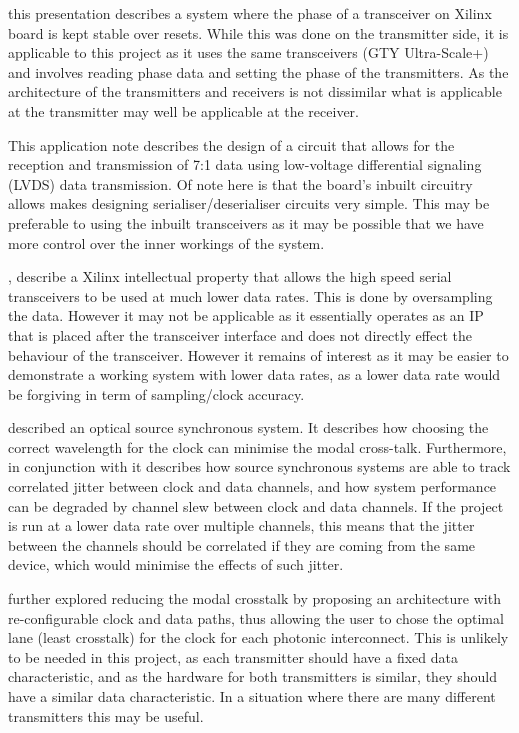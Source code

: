 \noindent \cite{mendes_transceiver} this presentation describes a system where
the phase of a transceiver on Xilinx board is kept stable over resets. While
this was done on the transmitter side, it is applicable to this project as it
uses the same transceivers (GTY Ultra-Scale+) and involves reading phase data
and setting the phase of the transmitters. As the architecture of the
transmitters and receivers is not dissimilar what is applicable at the
transmitter may well be applicable at the receiver.

\noindent \cite{serdes}  This application note describes the design of 
a circuit that allows for the reception and transmission of 7:1 data using
low-voltage differential signaling (LVDS) data transmission. Of note here is
that the board's inbuilt circuitry allows makes designing serialiser/deserialiser
circuits very simple. This may be preferable to using the inbuilt transceivers
as it may be possible that we have more control over the inner workings of the
system.

\noindent \cite{dru_guide}, \cite{nidru} describe a Xilinx intellectual
property that allows the high speed serial transceivers to be used at much
lower data rates. This is done by oversampling the data. However it may not be
applicable as it essentially operates as an IP that is placed after the
transceiver interface and does not directly effect the behaviour of the
transceiver. However it remains of interest as it may be easier to demonstrate a
working system with lower data rates, as a lower data rate would be forgiving in
term of sampling/clock accuracy.

\noindent \cite{williams2016source} described an optical source synchronous
system. It describes how choosing the correct wavelength for the clock can
minimise the modal cross-talk. Furthermore, in conjunction with
\cite{ragab2011receiver} it describes how source synchronous systems are able
to track correlated jitter between clock and data channels, and how system
performance can be degraded by channel slew between clock and data channels.
If the project is run at a lower data rate over multiple channels, this means
that the jitter between the channels should be correlated if they are coming
from the same device, which would minimise the effects of such jitter.

\cleardoublepage

\noindent \cite{williams2019reconfiguration} further explored reducing the
modal crosstalk by proposing an architecture with re-configurable clock and
data paths, thus allowing the user to chose the optimal lane (least crosstalk)
for the clock for each photonic interconnect. This is unlikely to be needed in
this project, as each transmitter should have a fixed data characteristic, and
as the hardware for both transmitters is similar, they should have a similar
data characteristic.  In a situation where there are many different
transmitters this may be useful.


